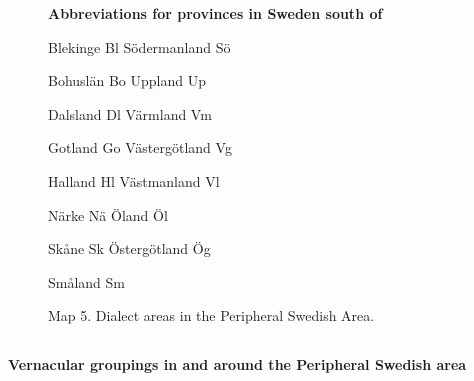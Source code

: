 \begin{figure}[h]
\centering
\begin{minipage}{5.875in}
\textbf{Abbreviations for provinces in Sweden south of}

Blekinge  Bl  Södermanland  Sö


Bohuslän  Bo  Uppland  Up


Dalsland  Dl  Värmland  Vm


Gotland  Go  Västergötland  Vg


Halland  Hl  Västmanland  Vl


Närke  Nä  Öland  Öl


Skåne  Sk  Östergötland  Ög


Småland  Sm    


\end{minipage}
\end{figure}
\clearpage%


\begin{figure}[h]
\centering
\begin{minipage}{6.65486in}
\label{bkm:Ref216765041}Map 5. Dialect areas in the Peripheral Swedish Area.
\end{minipage}
\end{figure}
\clearpage\subsection[]{\rmfamily }
\textbf{Vernacular groupings in and around the Peripheral Swedish area}


